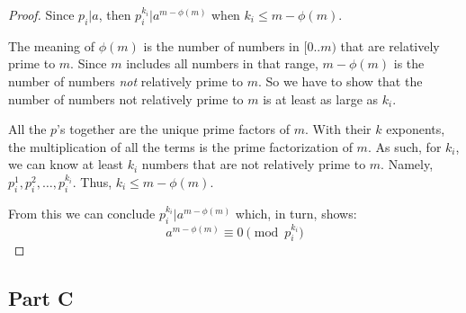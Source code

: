 \documentclass{article}
\begin{document}
\begin{proof}
Since $p_i \vert a$, then $p_i^{k_i} \vert a^{m - \phi(m)}$ when $k_i \leq m -
\phi(m)$.

\bigbreak

The meaning of $\phi(m)$ is the number of numbers in $[0..m)$ that are
relatively prime to $m$. Since $m$ includes all numbers in that range, $m -
\phi(m)$ is the number of numbers \textit{not} relatively prime to $m$. So we
have to show that the number of numbers not relatively prime to $m$ is at least
as large as $k_i$.

\bigbreak

All the $p$'s together are the unique prime factors of $m$. With their $k$
exponents, the multiplication of all the terms is the prime factorization of
$m$. As such, for $k_i$, we can know at least $k_i$ numbers that are not
relatively prime to $m$. Namely, $p_i^{1}, p_i^{2}, \ldots, p_i^{k_i}$.
Thus, $k_i \leq m - \phi(m)$.

\bigbreak

From this we can conclude $p_i^{k_i} \vert a^{m - \phi(m)}$ which, in turn,
shows:
$$ a^{m - \phi(m)} \equiv 0 \pmod{p_i^{k_i}} $$
\end{proof}

\break

\subsection*{Part C}
\end{document}
